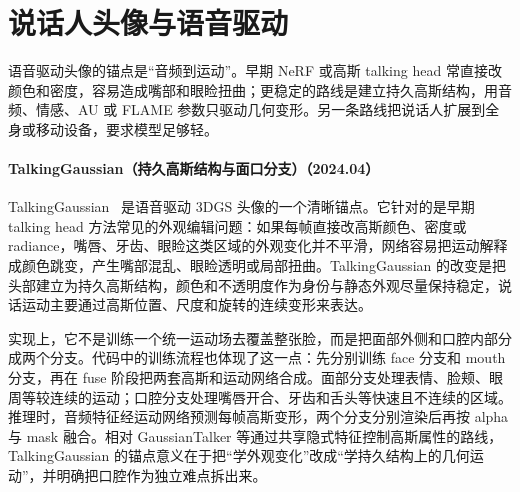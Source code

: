 \section{说话人头像与语音驱动}

语音驱动头像的锚点是“音频到运动”。早期 NeRF 或高斯 talking head 常直接改颜色和密度，容易造成嘴部和眼睑扭曲；更稳定的路线是建立持久高斯结构，用音频、情感、AU 或 FLAME 参数只驱动几何变形。另一条路线把说话人扩展到全身或移动设备，要求模型足够轻。
\paragraph{TalkingGaussian（持久高斯结构与面口分支）（2024.04）}
TalkingGaussian~\cite{2404_15264} 是语音驱动 3DGS 头像的一个清晰锚点。它针对的是早期 talking head 方法常见的外观编辑问题：如果每帧直接改高斯颜色、密度或 radiance，嘴唇、牙齿、眼睑这类区域的外观变化并不平滑，网络容易把运动解释成颜色跳变，产生嘴部混乱、眼睑透明或局部扭曲。TalkingGaussian 的改变是把头部建立为持久高斯结构，颜色和不透明度作为身份与静态外观尽量保持稳定，说话运动主要通过高斯位置、尺度和旋转的连续变形来表达。

实现上，它不是训练一个统一运动场去覆盖整张脸，而是把面部外侧和口腔内部分成两个分支。代码中的训练流程也体现了这一点：先分别训练 face 分支和 mouth 分支，再在 fuse 阶段把两套高斯和运动网络合成。面部分支处理表情、脸颊、眼周等较连续的运动；口腔分支处理嘴唇开合、牙齿和舌头等快速且不连续的区域。推理时，音频特征经运动网络预测每帧高斯变形，两个分支分别渲染后再按 alpha 与 mask 融合。相对 GaussianTalker 等通过共享隐式特征控制高斯属性的路线，TalkingGaussian 的锚点意义在于把“学外观变化”改成“学持久结构上的几何运动”，并明确把口腔作为独立难点拆出来。


